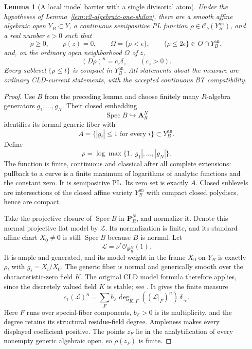 \documentclass[11pt,a4paper]{article}
\numberwithin{equation}{section}
\newtheorem{lemma}[theorem]{Lemma}
\theoremstyle{definition}
\theoremstyle{remark}
\newcommand{\Cb}{\mathcal C_b}
\newcommand{\an}{\mathrm{an}}
\begin{document}
\begin{lemma}[A local model barrier with a single divisorial atom]
\label{lem:r2-local-dirac-barrier}
Under the hypotheses of Lemma~\ref{lem:r2-algebraic-one-shilov},
there are a smooth affine algebraic open $Y_B\subset Y$, a
continuous semipositive PL function $\rho\in\Cb(Y_B^{\an})$,
and a real number $\epsilon>0$ such that
\[
 \rho\geq0,\qquad \rho(z)=0,\qquad
 \Omega=\{\rho<\epsilon\},\qquad
 \{\rho\leq2\epsilon\}\Subset O\cap Y_B^{\an},
\]
and, on the ordinary open neighborhood $\Omega$ of $z$,
\[
 (D\rho)^n=c_z\delta_z\qquad(c_z>0).
\]
Every sublevel $\{\rho\leq t\}$ is compact in $Y_B^{\an}$.
All statements about the measure are ordinary CLD-current
statements, with the accepted continuous BT compatibility.
\end{lemma}

\begin{proof}
Use $B$ from the preceding lemma and choose finitely many
$R$-algebra generators $g_1,\ldots,g_N$. Their closed embedding
\[
 \operatorname{Spec}B\hookrightarrow\mathbf A_R^N
\]
identifies its formal generic fiber with
\[
 A=\{|g_i|\leq1\text{ for every }i\}\subset Y_B^{\an}.
\]
Define
\[
 \rho=\log\max\{1,|g_1|,\ldots,|g_N|\}.
\]
The function is finite, continuous and classical after all complete
extensions: pullback to a curve is a finite maximum of logarithms
of analytic functions and the constant zero. It is semipositive PL.
Its zero set is exactly $A$. Closed sublevels are intersections of
the closed affine variety $Y_B^{\an}$ with compact closed
polydiscs, hence are compact.

Take the projective closure of $\operatorname{Spec}B$ in
$\mathbf P_R^N$, and normalize it. Denote this normal projective
flat model by $\mathscr Z$. Its normalization is finite, and its
standard affine chart $X_0\ne0$ is still $\operatorname{Spec}B$
because $B$ is normal. Let
\[
 \mathscr L=\nu^*\mathcal O_{\mathbf P_R^N}(1).
\]
It is ample and generated, and its model weight in the frame
$X_0$ on $Y_B$ is exactly $\rho$, with $g_i=X_i/X_0$.
The generic fiber is normal and generically smooth over the
characteristic-zero field $K$. The original CLD model formula
therefore applies, since the discretely valued field $K$ is stable;
see \cite[Theorem~6.9.3, \S6.9.6 and Proposition~6.9.7]{CLD12}.
It gives the finite measure
\[
 c_1(\mathscr L)^n
   =\sum_F b_F\deg_{\widetilde K,F}
                    ((\mathscr L|_F)^n)\,\delta_{z_F}.
\]
Here $F$ runs over special-fiber components, $b_F>0$ is its
multiplicity, and the degree retains its structural residue-field
degree. Ampleness makes every displayed coefficient positive.
The points $z_F$ lie in the analytification of every nonempty
generic algebraic open, so $\rho(z_F)$ is finite.


\end{proof}
\end{document}
